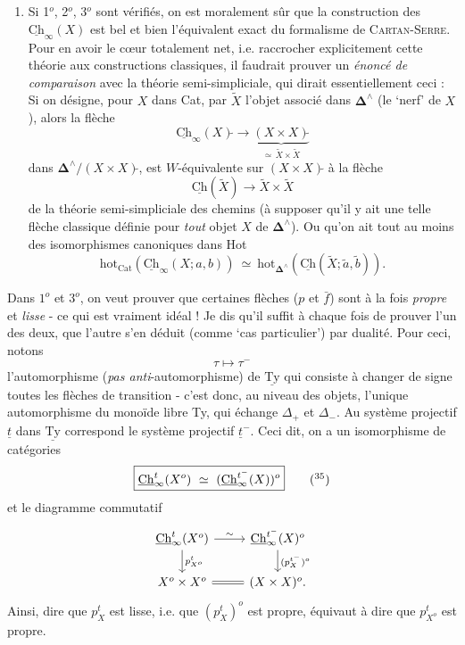 \documentclass[11pt]{article}
\newcommand{\printedpage}[1]{\marginpar{\footnotesize p.~#1}}
\newcommand{\msp}[1]{\marginpar{\footnotesize [#1]}}
\newcommand{\Ch}{\underline{\mathrm{Ch}}}
\newcommand{\Ty}{\underline{\mathrm{Ty}}}
\newcommand{\uCh}{\underline{\mathrm{Ch}}}
\newcommand{\hot}{\mathrm{hot}}
\begin{document}
\begin{enumerate}[label={}, leftmargin=*]
Le cas qui nous occupe ici serait celui où $\mathbf{D}=\mathrm{HOT}$, où on prend $H^{\mathbf{D}}_\bullet$, et $a=$ objet final de $\mathbf{D}(e)=\mathrm{Hot}$.)

\item[5$^o$)] Si 1$^o$, 2$^o$, 3$^o$ sont vérifiés, on est moralement sûr que la construction des $\uCh_\infty(X)$ est bel et bien l'équivalent exact du formalisme de \textsc{Cartan-Serre}. Pour en avoir le c\oe ur totalement net, i.e. raccrocher explicitement cette théorie aux constructions classiques, il faudrait prouver un \textit{énoncé de comparaison} avec la théorie semi-simpliciale, qui dirait essentiellement ceci : Si on désigne, pour $X$ dans Cat, par $\tilde{X}$ l'objet associé dans $\mathbf{\Delta}^\wedge$ (le `nerf' de $X$), alors la flèche
\[
\uCh_\infty(X)\tilde{}\longrightarrow\underbrace{(X\times X)\tilde{}}_{\simeq\,\tilde{X}\times\tilde{X}}
\]
dans $\mathbf{\Delta}^\wedge/(X\times X)\tilde{}$, est $W$-équivalente sur $(X\times X)\tilde{}$ à la flèche
\[
\uCh(\tilde{X})\longrightarrow\tilde{X}\times\tilde{X}
\]
de la théorie semi-simpliciale des chemins (à supposer qu'il y ait une telle flèche classique définie pour \textit{tout} objet $X$ de $\mathbf{\Delta}^\wedge$). Ou qu'on ait tout au moins des isomorphismes canoniques dans Hot
\[
\hot_{\mathrm{Cat}}(\uCh_\infty(X;a,b))\ \simeq\ \hot_{\mathbf{\Delta}^\wedge}(\uCh(\tilde{X};\tilde{a},\tilde{b})).
\]
\end{enumerate}

\printedpage{89}

\msp{page 143}
Dans $1^o$ et $3^o$, on veut prouver que certaines flèches ($p$ et $\bar{f}$) sont à la fois \textit{propre} et \textit{lisse} - ce qui est vraiment idéal ! Je dis qu'il suffit à chaque fois de prouver l'un des deux, que l'autre s'en déduit (comme `cas particulier') par dualité. Pour ceci, notons
\[
\tau \longmapsto \tau^{-}
\]
l'automorphisme (\textit{pas anti}-automorphisme) de $\Ty$ qui consiste à changer de signe toutes les flèches de transition - c'est donc, au niveau des objets, l'unique automorphisme du monoïde libre Ty, qui échange $\Delta_+$ et $\Delta_-$. Au système projectif $\underline{t}$ dans $\Ty$ correspond le système projectif $\underline{t}^-$. Ceci dit, on a un isomorphisme de catégories
\[
\boxed{\Ch^{t}_{\infty}(X^o) \ \simeq\ (\Ch^{t^-}_{\infty}(X))^o} \tag*{$(^{35})$} %
\]
et le diagramme commutatif
\[
\begin{tikzcd}
\Ch^{t}_{\infty}(X^o) \arrow[r, "\sim"] \arrow[d, "p^{t}_{X^o}"] & \Ch^{t^-}_{\infty}(X)^o \arrow[d, "(p^{t^-}_{X})^o"] \\
X^o \times X^o \arrow[r, equal] & (X \times X)^o.
\end{tikzcd}
\]
Ainsi, dire que $p^{t}_{X}$ est lisse, i.e. que $(p^{t}_{X})^o$ est propre, équivaut à dire que $p^{t}_{X^o}$ est propre.
\end{document}
